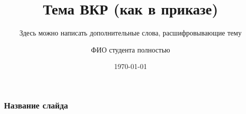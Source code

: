 \documentclass[10pt,pdf,hyperref={unicode}]{beamer}
\title{Тема ВКР (как в приказе)}
\subtitle{Здесь можно написать дополнительные слова, расшифровывающие тему}
\author{ФИО студента полностью}
\date{\today}
\begin{document}
	\begin{frame}
		\titlepage
	\end{frame} 
	
\begin{frame}
	\frametitle{Название слайда}
\end{frame}
\end{document}
